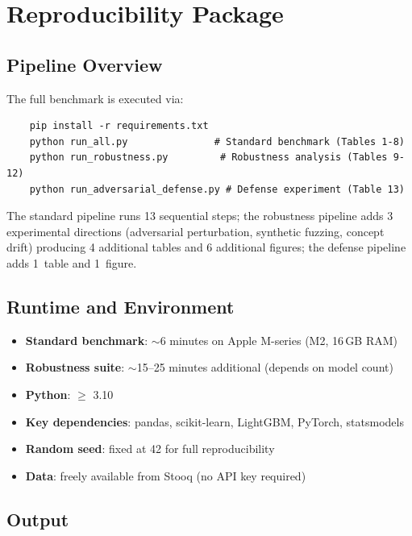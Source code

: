 \documentclass[preprint,review,12pt]{elsarticle}
\begin{document}
\section{Reproducibility Package}
\label{sec:reproducibility}

\subsection{Pipeline Overview}

The full benchmark is executed via:
\begin{verbatim}
    pip install -r requirements.txt
    python run_all.py               # Standard benchmark (Tables 1-8)
    python run_robustness.py         # Robustness analysis (Tables 9-12)
    python run_adversarial_defense.py # Defense experiment (Table 13)
\end{verbatim}

The standard pipeline runs 13 sequential steps; the robustness pipeline adds 3 experimental directions (adversarial perturbation, synthetic fuzzing, concept drift) producing 4 additional tables and 6 additional figures; the defense pipeline adds 1~table and 1~figure.

\subsection{Runtime and Environment}

\begin{itemize}[leftmargin=1.4em]
  \item \textbf{Standard benchmark}: $\sim$6 minutes on Apple M-series (M2, 16\,GB RAM)
  \item \textbf{Robustness suite}: $\sim$15--25 minutes additional (depends on model count)
  \item \textbf{Python}: $\geq$ 3.10
  \item \textbf{Key dependencies}: pandas, scikit-learn, LightGBM, PyTorch, statsmodels
  \item \textbf{Random seed}: fixed at 42 for full reproducibility
  \item \textbf{Data}: freely available from Stooq (no API key required)
\end{itemize}

\subsection{Output}
\end{document}
